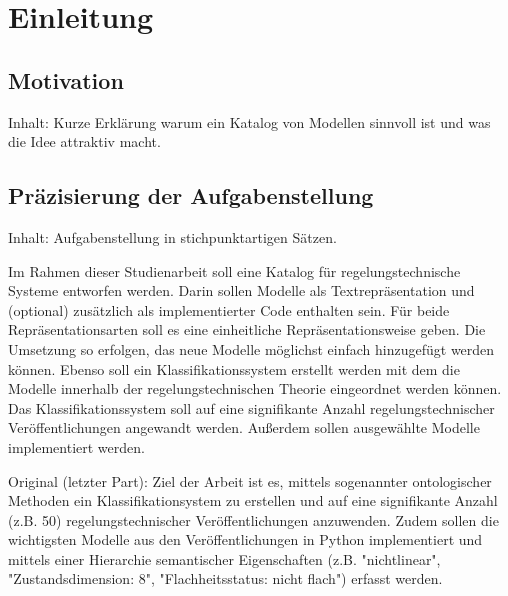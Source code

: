\chapter{Einleitung}
\section{Motivation}
Inhalt: Kurze Erklärung warum ein Katalog von Modellen sinnvoll ist und was die Idee attraktiv macht.

\section{Präzisierung der Aufgabenstellung}
Inhalt: Aufgabenstellung in stichpunktartigen Sätzen.

Im Rahmen dieser Studienarbeit soll eine Katalog für regelungstechnische Systeme entworfen werden. Darin sollen Modelle als Textrepräsentation und (optional) zusätzlich als implementierter Code enthalten sein. Für beide Repräsentationsarten soll es eine einheitliche Repräsentationsweise geben. Die Umsetzung so erfolgen, das neue Modelle möglichst einfach hinzugefügt werden können. Ebenso soll ein Klassifikationssystem erstellt werden mit dem die Modelle innerhalb der regelungstechnischen Theorie eingeordnet werden können. Das Klassifikationssystem soll auf eine signifikante Anzahl regelungstechnischer Veröffentlichungen angewandt werden. Außerdem sollen ausgewählte  Modelle implementiert werden.

Original (letzter Part): Ziel der Arbeit ist es, mittels sogenannter ontologischer Methoden ein Klassifikationsystem zu erstellen und auf eine signifikante Anzahl (z.B. 50) regelungstechnischer Veröffentlichungen anzuwenden. Zudem sollen die wichtigsten Modelle aus den Veröffentlichungen in Python implementiert und mittels einer Hierarchie semantischer Eigenschaften (z.B. "nichtlinear", "Zustandsdimension: 8", "Flachheitsstatus: nicht flach") erfasst werden.